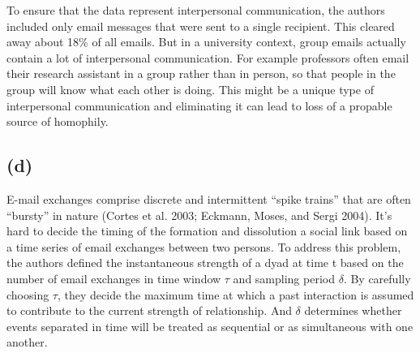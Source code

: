 \documentclass[11pt]{article}
\begin{document}
To ensure that the data represent interpersonal communication, the
authors included only email messages that were sent to a single
recipient. This cleared away about 18\% of all emails. But in a
university context, group emails actually contain a lot of interpersonal
communication. For example professors often email their research
assistant in a group rather than in person, so that people in the group
will know what each other is doing. This might be a unique type of
interpersonal communication and eliminating it can lead to loss of a
propable source of homophily.

    \subsection{(d)}\label{d}

E-mail exchanges comprise discrete and intermittent ``spike trains''
that are often ``bursty'' in nature (Cortes et al. 2003; Eckmann, Moses,
and Sergi 2004). It's hard to decide the timing of the formation and
dissolution a social link based on a time series of email exchanges
between two persons. To address this problem, the authors defined the
instantaneous strength of a dyad at time t based on the number of email
exchanges in time window \(\tau\) and sampling period \(\delta\). By
carefully choosing \(\tau\), they decide the maximum time at which a
past interaction is assumed to contribute to the current strength of
relationship. And \(\delta\) determines whether events separated in time
will be treated as sequential or as simultaneous with one another.


    
    
    
    
\end{document}
